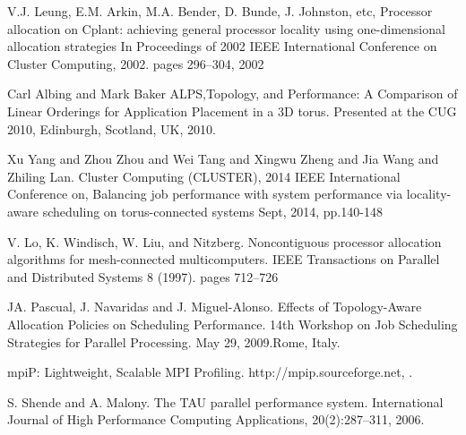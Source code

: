 \documentclass[conference]{IEEEtran}
\begin{document}
\begin{thebibliography}{10}


V.J. Leung,  E.M. Arkin, M.A. Bender,  D. Bunde, J. Johnston, etc,
\newblock Processor allocation on Cplant: achieving general processor locality using one-dimensional allocation strategies
\newblock In {Proceedings of 2002 IEEE International Conference on Cluster Computing, 2002}.  pages 296--304, 2002

Carl Albing and Mark Baker
\newblock ALPS,Topology, and Performance: A Comparison of Linear Orderings for 
Application Placement in a 3D torus.
\newblock Presented at the CUG 2010, Edinburgh, Scotland, UK, 2010.

Xu Yang and Zhou Zhou and Wei Tang and Xingwu Zheng and Jia Wang and Zhiling Lan.
\newblock Cluster Computing (CLUSTER), 2014 IEEE International Conference on,
\newblock Balancing job performance with system performance via locality-aware scheduling on torus-connected systems
\newblock Sept, 2014,
\newblock pp.140-148

V. Lo,  K. Windisch, W.  Liu, and Nitzberg.
\newblock Noncontiguous processor allocation algorithms for mesh-connected multicomputers.
\newblock IEEE Transactions on Parallel and Distributed Systems 8 (1997). pages 712--726

JA. Pascual, J. Navaridas and  J. Miguel-Alonso. 
\newblock Effects of Topology-Aware Allocation Policies on Scheduling Performance. 
\newblock 14th Workshop on Job Scheduling Strategies for Parallel Processing. May 29, 2009.Rome, Italy.


\newblock mpiP: Lightweight, Scalable MPI Profiling.
\newblock http://mpip.sourceforge.net, 
.

S. Shende and A. Malony. 
\newblock The TAU parallel performance system. 
\newblock International Journal of High Performance Computing Applications, 20(2):287–311, 2006.


\end{thebibliography}
\end{document}
